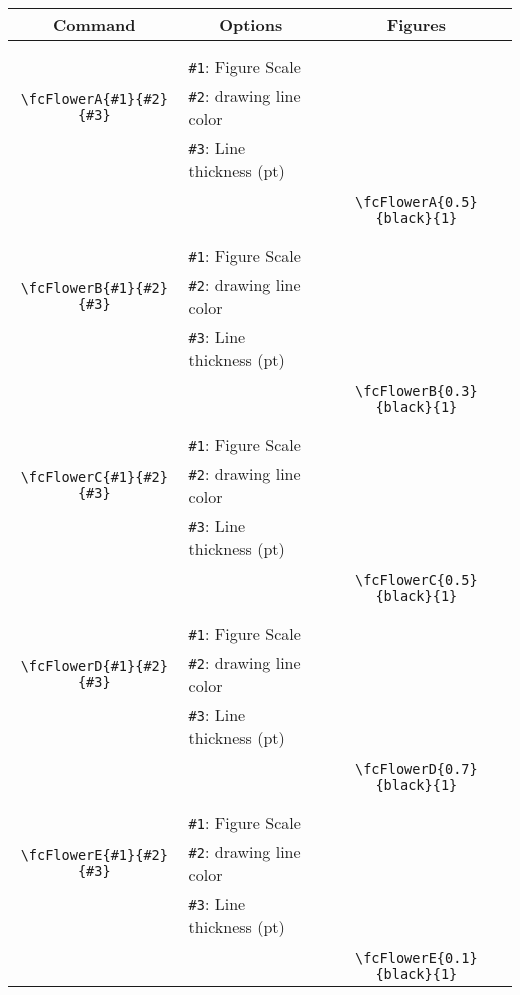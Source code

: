 \documentclass[x11names]{article}
\begin{document}
\begin{table}[H]\centering\begin{tabular}{|c|l|c|}\hline {\bf Command}& \multicolumn{1}{c|}{{\bf Options}} & {\bf Figures}\\  \hline	&&\multirow{5}{*}{\fcFlowerA{0.5}{black}{1}}\\	&&\\	&\verb|#1|: Figure Scale &\\	\verb|\fcFlowerA{#1}{#2}{#3}|&	\verb|#2|: drawing line color &\\	&\verb|#3|: Line thickness (pt) &\\ &&\\&&	\verb|\fcFlowerA{0.5}{black}{1}|\\\hline 	
	&&\multirow{5}{*}{\fcFlowerB{0.3}{black}{1}}\\	&&\\	&\verb|#1|: Figure Scale &\\	\verb|\fcFlowerB{#1}{#2}{#3}|&	\verb|#2|: drawing line color &\\	&\verb|#3|: Line thickness (pt) &\\ &&\\&&	\verb|\fcFlowerB{0.3}{black}{1}|\\\hline 	
	&&\multirow{5}{*}{\fcFlowerC{0.5}{black}{1}}\\	&&\\	&\verb|#1|: Figure Scale &\\	\verb|\fcFlowerC{#1}{#2}{#3}|&	\verb|#2|: drawing line color &\\	&\verb|#3|: Line thickness (pt) &\\ &&\\&&	\verb|\fcFlowerC{0.5}{black}{1}|\\\hline 	
	&&\multirow{5}{*}{\fcFlowerD{0.7}{black}{1}}\\	&&\\	&\verb|#1|: Figure Scale &\\	\verb|\fcFlowerD{#1}{#2}{#3}|&	\verb|#2|: drawing line color &\\	&\verb|#3|: Line thickness (pt) &\\ &&\\&&	\verb|\fcFlowerD{0.7}{black}{1}|\\\hline 	
	&&\multirow{5}{*}{\fcFlowerE{0.1}{black}{1}}\\	&&\\	&\verb|#1|: Figure Scale &\\	\verb|\fcFlowerE{#1}{#2}{#3}|&	\verb|#2|: drawing line color &\\	&\verb|#3|: Line thickness (pt) &\\ &&\\&&	\verb|\fcFlowerE{0.1}{black}{1}|\\\hline 	

\end{tabular}
\end{table}
\end{document}
